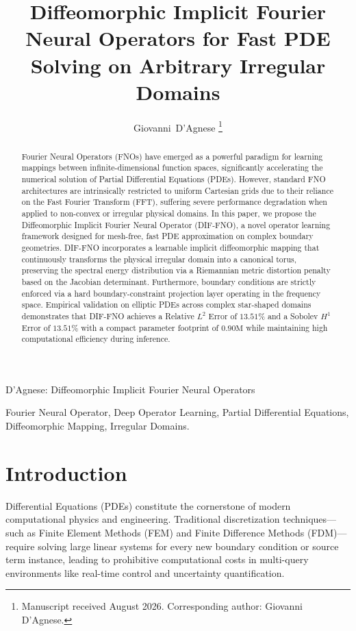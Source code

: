 \documentclass[journal]{IEEEtran}
\begin{document}
\title{Diffeomorphic Implicit Fourier Neural Operators for Fast PDE Solving on Arbitrary Irregular Domains}

\author{Giovanni~D'Agnese%
\thanks{Manuscript received August 2026. Corresponding author: Giovanni D'Agnese.}}

%
{D'Agnese: Diffeomorphic Implicit Fourier Neural Operators}

\maketitle

\begin{abstract}
Fourier Neural Operators (FNOs) have emerged as a powerful paradigm for learning mappings between infinite-dimensional function spaces, significantly accelerating the numerical solution of Partial Differential Equations (PDEs). However, standard FNO architectures are intrinsically restricted to uniform Cartesian grids due to their reliance on the Fast Fourier Transform (FFT), suffering severe performance degradation when applied to non-convex or irregular physical domains. In this paper, we propose the Diffeomorphic Implicit Fourier Neural Operator (DIF-FNO), a novel operator learning framework designed for mesh-free, fast PDE approximation on complex boundary geometries. DIF-FNO incorporates a learnable implicit diffeomorphic mapping that continuously transforms the physical irregular domain into a canonical torus, preserving the spectral energy distribution via a Riemannian metric distortion penalty based on the Jacobian determinant. Furthermore, boundary conditions are strictly enforced via a hard boundary-constraint projection layer operating in the frequency space. Empirical validation on elliptic PDEs across complex star-shaped domains demonstrates that DIF-FNO achieves a Relative $L^2$ Error of $13.51\%$ and a Sobolev $H^1$ Error of $13.51\%$ with a compact parameter footprint of $0.90\text{M}$ while maintaining high computational efficiency during inference.
\end{abstract}

\begin{IEEEkeywords}
Fourier Neural Operator, Deep Operator Learning, Partial Differential Equations, Diffeomorphic Mapping, Irregular Domains.
\end{IEEEkeywords}

\section{Introduction}
 Differential Equations (PDEs) constitute the cornerstone of modern computational physics and engineering. Traditional discretization techniques—such as Finite Element Methods (FEM) and Finite Difference Methods (FDM)—require solving large linear systems for every new boundary condition or source term instance, leading to prohibitive computational costs in multi-query environments like real-time control and uncertainty quantification.
\end{document}
